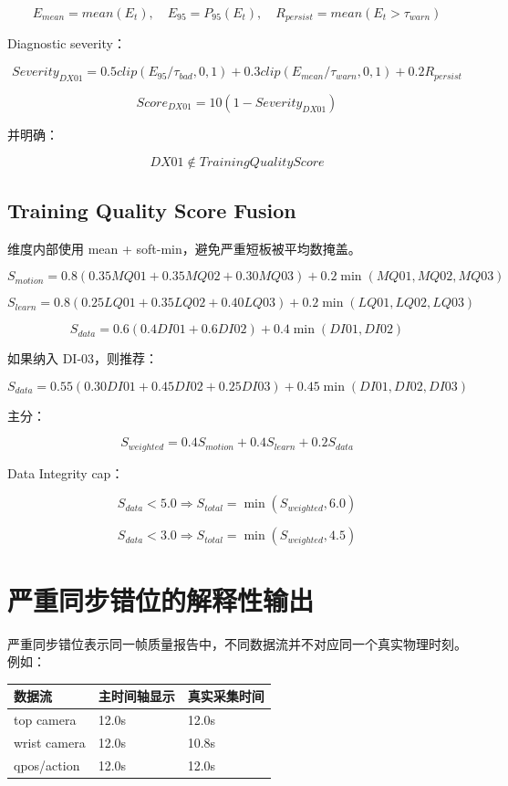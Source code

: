 \documentclass[UTF8,zihao=-4,oneside,openany]{ctexrep}
\begin{document}
\[
E_{mean}=mean(E_t),\quad E_{95}=P_{95}(E_t),\quad R_{persist}=mean(E_t>\tau_{warn})
\]

Diagnostic severity：

\[
Severity_{DX01}=0.5clip(E_{95}/\tau_{bad},0,1)+0.3clip(E_{mean}/\tau_{warn},0,1)+0.2R_{persist}
\]

\[
Score_{DX01}=10(1-Severity_{DX01})
\]

并明确：

\[
DX01\notin TrainingQualityScore
\]

\subsection{Training Quality Score Fusion}

维度内部使用 mean + soft-min，避免严重短板被平均数掩盖。

\[
S_{motion}=0.8(0.35MQ01+0.35MQ02+0.30MQ03)+0.2\min(MQ01,MQ02,MQ03)
\]

\[
S_{learn}=0.8(0.25LQ01+0.35LQ02+0.40LQ03)+0.2\min(LQ01,LQ02,LQ03)
\]

\[
S_{data}=0.6(0.4DI01+0.6DI02)+0.4\min(DI01,DI02)
\]

如果纳入 DI-03，则推荐：

\[
S_{data}=0.55(0.30DI01+0.45DI02+0.25DI03)+0.45\min(DI01,DI02,DI03)
\]

主分：

\[
S_{weighted}=0.4S_{motion}+0.4S_{learn}+0.2S_{data}
\]

Data Integrity cap：

\[
S_{data}<5.0\Rightarrow S_{total}=\min(S_{weighted},6.0)
\]

\[
S_{data}<3.0\Rightarrow S_{total}=\min(S_{weighted},4.5)
\]

\section{严重同步错位的解释性输出}

严重同步错位表示同一帧质量报告中，不同数据流并不对应同一个真实物理时刻。例如：

\begin{center}
\begin{tabular}{lll}
\toprule
数据流 & 主时间轴显示 & 真实采集时间 \\
\midrule
top camera & 12.0s & 12.0s \\
wrist camera & 12.0s & 10.8s \\
qpos/action & 12.0s & 12.0s \\
\bottomrule
\end{tabular}
\end{center}
\end{document}
